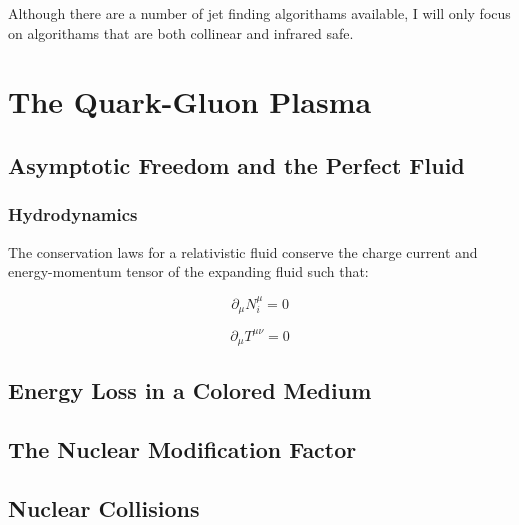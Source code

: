 Although there are a number of jet finding algorithams available, I will only focus on algorithams that are both collinear and infrared safe.   






\section{The Quark-Gluon Plasma}

\subsection{Asymptotic Freedom and the Perfect Fluid}

\subsubsection{Hydrodynamics}
The conservation laws for a relativistic fluid conserve the charge current and energy-momentum tensor of the expanding fluid such that:

\begin{equation}
\partial_{\mu} N_{\textit{i}}^{\mu} = 0
\label{eq:hydrochrg}
\end{equation}

\begin{equation}
\partial_{\mu} T^{\mu \nu} = 0
\label{eq:hydroenrgy}
\end{equation}

\subsection{Energy Loss in a Colored Medium}

\subsection{The Nuclear Modification Factor}

\subsection{Nuclear Collisions}

